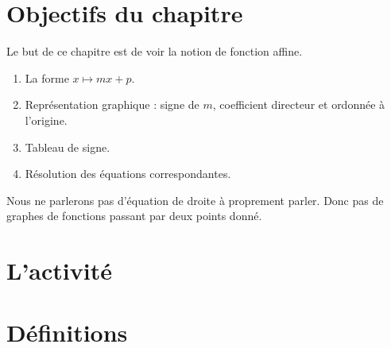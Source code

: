 
\section{Objectifs du chapitre}

Le but de ce chapitre est de voir la notion de fonction affine.
\begin{enumerate}
    \item
        La forme \( x\mapsto mx+p\).
    \item
        Représentation graphique : signe de \( m\), coefficient directeur et ordonnée à l'origine.
    \item
        Tableau de signe.
    \item
        Résolution des équations correspondantes.
\end{enumerate}
Nous ne parlerons pas d'équation de droite à proprement parler. Donc pas de graphes de fonctions passant par deux points donné.


\vspace{1cm}


\section{L'activité}



\section{Définitions}

